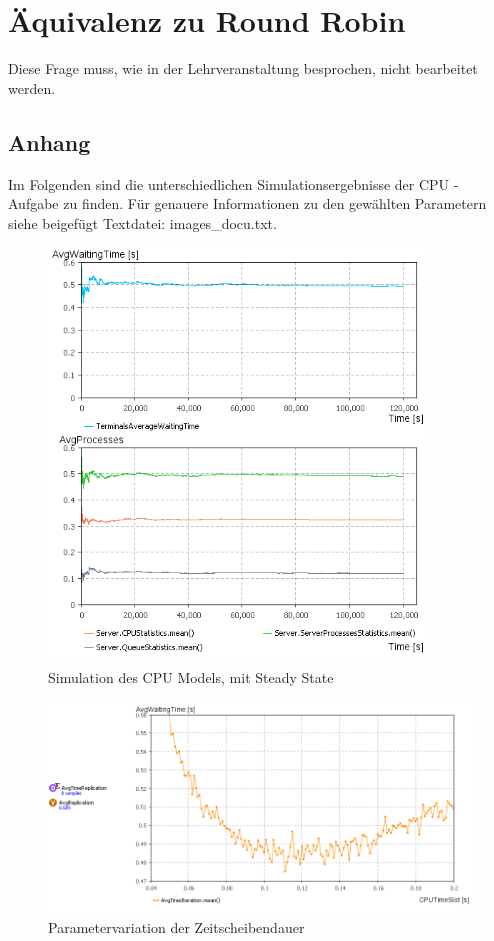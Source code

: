 \documentclass[
a4paper,   
headsepline, 
fleqn,     
11pt
]{scrartcl}
\begin{document}
\section{Äquivalenz zu Round Robin}
Diese Frage muss, wie in der Lehrveranstaltung besprochen, nicht bearbeitet werden.

\newpage

\subsection*{Anhang}
Im Folgenden sind die unterschiedlichen Simulationsergebnisse der CPU - Aufgabe zu finden. Für genauere Informationen zu den gewählten Parametern siehe beigefügt Textdatei: images\_docu.txt.

\begin{figure}[h]
  \centering
  \includegraphics[width=0.9\textwidth]{./images/Simulation_SteadyState}
  \caption{Simulation des CPU Models, mit Steady State}
  \label{fig:SimulationA}
\end{figure}

\begin{figure}[h]
  \centering
  \includegraphics[width=1\textwidth]{./images/ParameterVariationCPUTimeSlot}
  \caption{Parametervariation der Zeitscheibendauer}
  \label{fig:ParametervariationB}
\end{figure}
\end{document}
